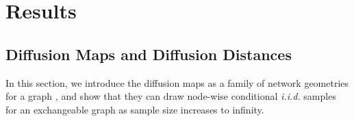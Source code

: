 \documentclass[11pt]{article}
\theoremstyle{definition}
\begin{document}
\vspace*{-0.2cm}
\section{Results}
\label{sec:method}
	\vspace*{-0.2cm}
\subsection{Diffusion Maps and Diffusion Distances}
\label{ssec:method2}

In this section, we introduce the diffusion maps as a family of network geometries for a graph \cite{coifman2006diffusion}, and show that they can draw node-wise conditional \textit{i.i.d.} samples for an exchangeable graph as sample size increases to infinity.
\end{document}

